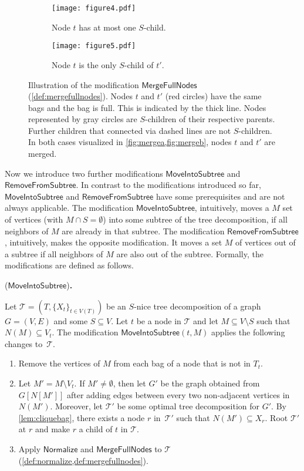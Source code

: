\documentclass[a4paper,UKenglish,cleveref, autoref, thm-restate, numberwithinsect]{lipics-v2021}
\newcounter{modification}
\newenvironment{modification}[1][]{\refstepcounter{modification}\renewcommand{\arraystretch}{.6}
\begin{center}
\begin{mdframed}[nobreak=true]{\normalsize\sffamily{\bfseries Modification~\themodification} (#1){\bfseries .}}

\vspace{.5ex}
\begin{normalsize}
}
{
\end{normalsize}
\end{mdframed}
\end{center}
}
\newcommand{\Normalize}{\mathsf{Normalize}}
\newcommand{\MoveIntoSubtree}{\mathsf{MoveIntoSubtree}}
\newcommand{\RemoveFromSubtree}{\mathsf{RemoveFromSubtree}}
\newcommand{\MergeFullNodes}{\mathsf{MergeFullNodes}}
\begin{document}
\begin{figure}[t]
\centering
\begin{subfigure}[t]{0.46\textwidth}
\centering
\texttt{[image: figure4.pdf]}
\caption{Node $t$ has at most one $S$-child.}\label{fig:mergea}
\end{subfigure}
\begin{subfigure}[t]{0.46\textwidth}
\centering
\texttt{[image: figure5.pdf]}
\caption{Node $t$ is the only $S$-child of $t'$.}\label{fig:mergeb}
\end{subfigure}
    \caption{Illustration of the modification $\MergeFullNodes$ (\cref{def:mergefullnodes}).
    Nodes $t$ and $t'$ (red circles) have the same bags and the bag is full. This is indicated by the thick line. Nodes represented by gray circles are $S$-children of their respective parents. Further children that connected via dashed lines are not $S$-children. In both cases visualized in \cref{fig:mergea,fig:mergeb}, nodes $t$ and $t'$ are merged.}\label{fig:mergefullnodes}
\end{figure}





Now we introduce two further modifications $\MoveIntoSubtree$ and $\RemoveFromSubtree$. In contrast to the modifications introduced so far, $\MoveIntoSubtree$ and $\RemoveFromSubtree$ have some prerequisites and are not always applicable. The modification $\MoveIntoSubtree$, intuitively, moves a $M$ set of vertices (with $M\cap S=\emptyset$) into some subtree of the tree decomposition, if all neighbors of $M$ are already in that subtree. The modification $\RemoveFromSubtree$, intuitively, makes the opposite modification. It moves a set $M$ of vertices out of a subtree if all neighbors of $M$ are also out of the subtree. Formally, the modifications are defined as follows.

\begin{modification}[$\MoveIntoSubtree$]\label{def:move}
      Let $\mathcal{T}=(T,\{X_t\}_{t\in V(T)})$ be an $S$-nice tree decomposition of a graph $G=(V,E)$ and some $S\subseteq V$. Let $t$ be a node in $\mathcal{T}$ and let $M\subseteq V\setminus S$ such that $N(M)\subseteq V_{t}$. The modification $\MoveIntoSubtree(t, M)$ applies the following changes to~$\mathcal{T}$.
     \begin{enumerate}
         \item Remove the vertices of $M$ from each bag of a node that is not in $T_t$. 
        
         \item Let $M'=M\setminus V_t$. If $M'\neq \emptyset$, then let $G'$ be the graph obtained from $G[N[M']]$ after adding edges between every two non-adjacent vertices in $N(M')$. Moreover, let $\mathcal{T}'$ be some optimal tree decomposition for $G'$. By \cref{lem:cliquebag}, there exists a node $r$ in~$\mathcal{T}'$ such that $N(M')\subseteq X_{r}$. Root $\mathcal{T}'$ at $r$ and make $r$ a child of $t$ in $\mathcal{T}$.
         \item Apply $\Normalize$ and $\MergeFullNodes$ to $\mathcal{T}$ (\cref{def:normalize,def:mergefullnodes}).
     \end{enumerate}
 \end{modification}
 
\end{document}
